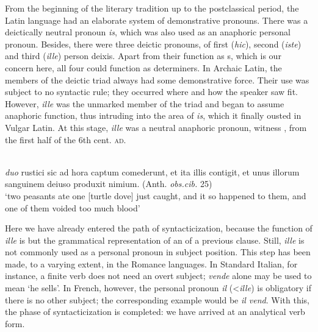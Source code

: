 From the beginning of the literary tradition up to the postclassical period, the Latin language had an elaborate system of demonstrative pronouns. There was a deictically neutral pronoun \textit{is}, which was also used as an anaphoric personal pronoun. Besides, there were three deictic pronouns, of first (\textit{hic}), second (\textit{iste}) and third (\textit{ille}) person deixis. Apart from their function as \np s, which is our concern here, all four could function as determiners. In Archaic Latin, the members of the deictic triad always had some demonstrative force. Their use was subject to no syntactic rule; they occurred where and how the speaker saw fit. However, \textit{ille} was the unmarked member of the triad and began to assume anaphoric function, thus intruding into the area of \textit{is}, which it finally ousted in Vulgar Latin. At this stage, \textit{ille} was a neutral anaphoric pronoun, witness , from the first half of the 6th cent. \textsc{ad}.

\ea\label{ex:E1}
 \\
\textit{duo} rustici sic ad hora captum comederunt, et ita illis contigit, et unus illorum sanguinem deiuso produxit nimium.  (Anth. \textit{obs.cib.} 25)\\
\glt ‘two peasants ate one [turtle dove] just caught, and it so happened to them, and one of them voided too much blood’ \\
\z

\noindent Here we have already entered the path of syntacticization, because the function of \textit{ille} is but the grammatical representation of an \np of a previous clause. Still, \textit{ille} is not commonly used as a personal pronoun in subject position. This step has been made, to a varying extent, in the Romance languages. In Standard Italian, for instance, a finite verb does not need an overt subject; \textit{vende} alone may be used to mean ‘he sells’. In French, however, the personal pronoun \textit{il} ({\textless}\textit{ille}) is obligatory if there is no other subject; the corresponding example would be \textit{il vend}. With this, the phase of syntacticization is completed: we have arrived at an analytical verb form.

